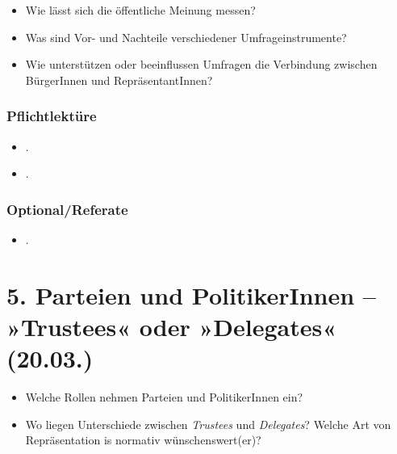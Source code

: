 \documentclass[abstract=on,parskip=full,headings=standardclasses,fontsize=11pt,paper=a4]{scrartcl}
\begin{document}
\begin{itemize}
\renewcommand\labelitemi{--}
\item Wie lässt sich die öffentliche Meinung messen?
\item Was sind Vor- und Nachteile verschiedener Umfrageinstrumente?
\item Wie unterstützen oder beeinflussen Umfragen die Verbindung zwischen BürgerInnen und RepräsentantInnen?
\end{itemize}


\subsubsection*{Pflichtlektüre}
\begin{itemize}
\item {}.
\item {}.
\end{itemize}


\subsubsection*{Optional/Referate}
\begin{itemize}
\item {}.
\end{itemize}


%


\section{5. Parteien und PolitikerInnen -- »Trustees« oder »Delegates« (20.03.)}

\begin{itemize}
\renewcommand\labelitemi{--}
\item Welche Rollen nehmen Parteien und PolitikerInnen ein?
\item Wo liegen Unterschiede zwischen \textit{Trustees} und \textit{Delegates}? Welche Art von Repräsentation is normativ wünschenswert(er)?
\end{itemize}
\end{document}

